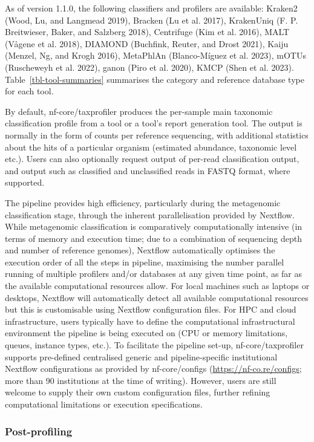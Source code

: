 \documentclass[
]{article}
\begin{document}
As of version 1.1.0, the following classifiers and profilers are
available: Kraken2 (Wood, Lu, and Langmead 2019), Bracken (Lu et al.
2017), KrakenUniq (F. P. Breitwieser, Baker, and Salzberg 2018),
Centrifuge (Kim et al. 2016), MALT (Vågene et al. 2018), DIAMOND
(Buchfink, Reuter, and Drost 2021), Kaiju (Menzel, Ng, and Krogh 2016),
MetaPhlAn (Blanco-Míguez et al. 2023), mOTUs (Ruscheweyh et al. 2022),
ganon (Piro et al. 2020), KMCP (Shen et al. 2023).
Table~\ref{tbl-tool-summaries} summarises the category and reference
database type for each tool.

By default, nf-core/taxprofiler produces the per-sample main taxonomic
classification profile from a tool or a tool's report generation tool.
The output is normally in the form of counts per reference sequencing,
with additional statistics about the hits of a particular organism
(estimated abundance, taxonomic level etc.). Users can also optionally
request output of per-read classification output, and output such as
classified and unclassified reads in FASTQ format, where supported.

The pipeline provides high efficiency, particularly during the
metagenomic classification stage, through the inherent parallelisation
provided by Nextflow. While metagenomic classification is comparatively
computationally intensive (in terms of memory and execution time; due to
a combination of sequencing depth and number of reference genomes),
Nextflow automatically optimises the execution order of all the steps in
pipeline, maximising the number parallel running of multiple profilers
and/or databases at any given time point, as far as the available
computational resources allow. For local machines such as laptops or
desktops, Nextflow will automatically detect all available computational
resources but this is customisable using Nextflow configuration files.
For HPC and cloud infrastructure, users typically have to define the
computational infrastructural environment the pipeline is being executed
on (CPU or memory limitations, queues, instance types, etc.). To
facilitate the pipeline set-up, nf-core/taxprofiler supports pre-defined
centralised generic and pipeline-specific institutional Nextflow
configurations as provided by nf-core/configs
(\url{https://nf-co.re/configs}; more than 90 institutions at the time
of writing). However, users are still welcome to supply their own custom
configuration files, further refining computational limitations or
execution specifications.

\hypertarget{post-profiling}{%
\subsubsection{Post-profiling}\label{post-profiling}}
\end{document}
